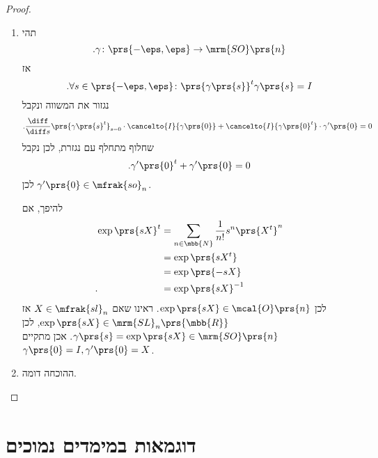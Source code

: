\documentclass[10pt, twoside]{book}
\begin{document}
\begin{proof}
\begin{enumerate}
\item%
תהי
\[\text{.} \gamma \colon \prs{-\eps, \eps} \to \mrm{SO}\prs{n}\]
אז
\[\text{.}\forall s \in \prs{-\eps,\eps} \colon \prs{\gamma\prs{s}}^t \gamma\prs{s} = I\]
נגזור את המשווה ונקבל
\[\text{.} \frac{\diff}{\diff s} \prs{\gamma\prs{s}^t}_{s = 0} \cdot \cancelto{I}{\gamma\prs{0}} + \cancelto{I}{\gamma\prs{0}^t} \cdot \gamma'\prs{0} = 0\]
שחלוף מתחלף עם נגזרת, לכן נקבל
\[\text{.} \gamma'\prs{0}^t + \gamma'\prs{0} = 0\]
לכן
$\gamma'\prs{0} \in \mfrak{so}_n$.

להיפך, אם
\begin{align*}
\exp\prs{sX}^t &= \sum_{n \in \mbb{N}} \frac{1}{n!} s^n \prs{X^t}^n
\\&= \exp\prs{sX^t}
\\&= \exp\prs{-sX}
\\\text{.} \hphantom{\exp\prs{sX}^t} &= \exp\prs{sX}^{-1}
\end{align*}
לכן
$\exp\prs{sX} \in \mcal{O}\prs{n}$.
ראינו שאם
$X \in \mfrak{sl}_n$
אז
$\exp\prs{sX} \in \mrm{SL}_n\prs{\mbb{R}}$,
לכן
$\gamma\prs{s} = \exp\prs{sX} \in \mrm{SO}\prs{n}$.
אכן מתקיים
$\gamma\prs{0} = I, \gamma'\prs{0} = X$.

\item%
ההוכחה דומה.
\end{enumerate}
\end{proof}


\section{דוגמאות במימדים נמוכים}
\end{document}
